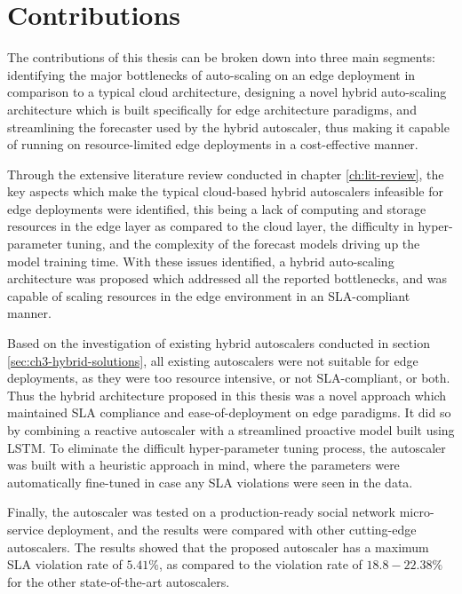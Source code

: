 \section{Contributions}
\label{sec:ch7-contribution}

The contributions of this thesis can be broken down into three main segments: identifying the major bottlenecks of auto-scaling on an edge deployment in comparison to a typical cloud architecture, designing a novel hybrid auto-scaling architecture which is built specifically for edge architecture paradigms, and streamlining the forecaster used by the hybrid autoscaler, thus making it capable of running on resource-limited edge deployments in a cost-effective manner.\par

Through the extensive literature review conducted in chapter \ref{ch:lit-review}, the key aspects which make the typical cloud-based hybrid autoscalers infeasible  for edge deployments were identified, this being a lack of computing and storage resources in the edge layer as compared to the cloud layer, the difficulty in hyper-parameter tuning, and the complexity of the forecast models driving up the model training time. With these issues identified, a hybrid auto-scaling architecture was proposed which addressed all the reported bottlenecks, and was capable of scaling resources in the edge environment in an SLA-compliant manner.\par

Based on the investigation of existing hybrid autoscalers conducted in section \ref{sec:ch3-hybrid-solutions}, all existing autoscalers were not suitable for edge deployments, as they were too resource intensive, or not SLA-compliant, or both. Thus the hybrid architecture proposed in this thesis was a novel approach which maintained SLA compliance and ease-of-deployment on edge paradigms. It did so by combining a reactive autoscaler with a streamlined proactive model built using LSTM. To eliminate the difficult hyper-parameter tuning process, the autoscaler was built with a heuristic approach in mind, where the parameters were automatically fine-tuned in case any SLA violations were seen in the data.\par

Finally, the autoscaler was tested on a production-ready social network micro-service deployment, and the results were compared with other cutting-edge autoscalers. The results showed that the proposed autoscaler has a maximum SLA violation rate of $5.41\%$, as compared to the violation rate of $18.8-22.38\%$ for the other state-of-the-art autoscalers.\par

